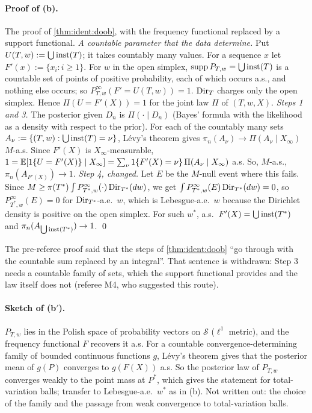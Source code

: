 \paragraph{Proof of (b).} The proof of \cref{thm:ident:doob}, with the frequency functional replaced by a support functional.
\emph{A countable parameter that the data determine.} Put $U(T,w):=\bigcup\mathrm{inst}(T)$; it takes countably many values. For a sequence $x$ let $F'(x):=\{x_i:i\ge1\}$. For $w$ in the open simplex, $\operatorname{supp}P_{T,w}=\bigcup\mathrm{inst}(T)$ is a countable set of points of positive probability, each of which occurs a.s., and nothing else occurs; so $P^\infty_{T,w}(F'=U(T,w))=1$. $\mathrm{Dir}_T$ charges only the open simplex. Hence $\Pi(U=F'(X))=1$ for the joint law $\Pi$ of $(T,w,X)$.
\emph{Steps 1 and 3.} The posterior given $D_n$ is $\Pi(\cdot\mid D_n)$ (Bayes' formula with the likelihood as a density with respect to the prior). For each of the countably many sets $A_\nu:=\{(T,w):\bigcup\mathrm{inst}(T)=\nu\}$, L\'evy's theorem gives $\pi_n(A_\nu)\to\Pi(A_\nu\mid X_\infty)$ $M$-a.s. Since $F'(X)$ is $X_\infty$-measurable, $1=\mathbb{E}[1\{U=F'(X)\}\mid X_\infty]=\sum_\nu1\{F'(X)=\nu\}\,\Pi(A_\nu\mid X_\infty)$ a.s. So, $M$-a.s., $\pi_n(A_{F'(X)})\to1$.
\emph{Step 4, changed.} Let $E$ be the $M$-null event where this fails. Since $M\ge\pi(T^*)\int P^\infty_{T^*,w}(\cdot)\,\mathrm{Dir}_{T^*}(dw)$, we get $\int P^\infty_{T^*,w}(E)\,\mathrm{Dir}_{T^*}(dw)=0$, so $P^\infty_{T^*,w}(E)=0$ for $\mathrm{Dir}_{T^*}$-a.e.\ $w$, which is Lebesgue-a.e.\ $w$ because the Dirichlet density is positive on the open simplex. For such $w^*$, a.s.\ $F'(X)=\bigcup\mathrm{inst}(T^*)$ and $\pi_n(A_{\bigcup\mathrm{inst}(T^*)})\to1$. \qed

The pre-referee proof said that the steps of \cref{thm:ident:doob} ``go through with the countable sum replaced by an integral''. That sentence is withdrawn: Step 3 needs a countable family of sets, which the support functional provides and the law itself does not (referee M4, who suggested this route).

\paragraph{Sketch of (b$'$).} $P_{T,w}$ lies in the Polish space of probability vectors on $\mathcal S$ ($\ell^1$ metric), and the frequency functional $F$ recovers it a.s. For a countable convergence-determining family of bounded continuous functions $g$, L\'evy's theorem gives that the posterior mean of $g(P)$ converges to $g(F(X))$ a.s. So the posterior law of $P_{T,w}$ converges weakly to the point mass at $P^*$, which gives the statement for total-variation balls; transfer to Lebesgue-a.e.\ $w^*$ as in (b). Not written out: the choice of the family and the passage from weak convergence to total-variation balls.

